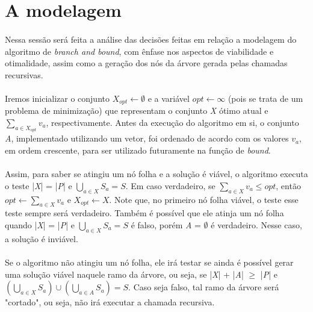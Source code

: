 \documentclass{article}
\begin{document}
\pagebreak

\section{A modelagem}

\paragraph{} Nessa sessão será feita a análise das decisões feitas em relação a modelagem do algoritmo de \emph{branch and bound}, com ênfase nos aspectos de viabilidade e otimalidade, assim como a geração dos nós da árvore gerada pelas chamadas recursivas.

\paragraph{} Iremos inicializar o conjunto \emph{$X_{opt} \leftarrow \emptyset$} e a variável \emph{$opt \leftarrow \infty$} (pois se trata de um problema de minimização) que representam o conjunto \emph{X} ótimo atual e \emph{$\sum_{a \in X_{opt}} v_a$}, respectivamente. Antes da execução do algoritmo em si, o conjunto \emph{A}, implementado utilizando um vetor, foi ordenado de acordo com os valores \emph{$v_a$}, em ordem crescente, para ser utilizado futuramente na função de \emph{bound}.

\paragraph{} Assim, para saber se atingiu um nó folha e a solução é viável, o algoritmo executa o teste |\emph{X}| = |\emph{P}| e \emph{$\bigcup_{a \in X} S_a = S$}. Em caso verdadeiro, se \emph{$\sum_{a \in X} v_a \leq opt$}, então \emph{$opt \leftarrow \sum_{a \in X} v_a$} e \emph{$X_{opt} \leftarrow X$}. Note que, no primeiro nó folha viável, o teste esse teste sempre será verdadeiro. Também é possível que ele atinja um nó folha quando |\emph{X}| = |\emph{P}| e \emph{$\bigcup_{a \in X} S_a = S$} é falso, porém \emph{A} = $\emptyset$ é verdadeiro. Nesse caso, a solução é inviável.

\paragraph{} Se o algoritmo não atingiu um nó folha, ele irá testar se ainda é possível gerar uma solução viável naquele ramo da árvore, ou seja, se |\emph{X}| + |\emph{A}| $\geq$ |\emph{P}| e \emph{$(\bigcup_{a \in X} S_a) \cup (\bigcup_{a \in A} S_a) = S$}. Caso seja falso, tal ramo da árvore será "cortado", ou seja, não irá executar a chamada recursiva.
\end{document}
